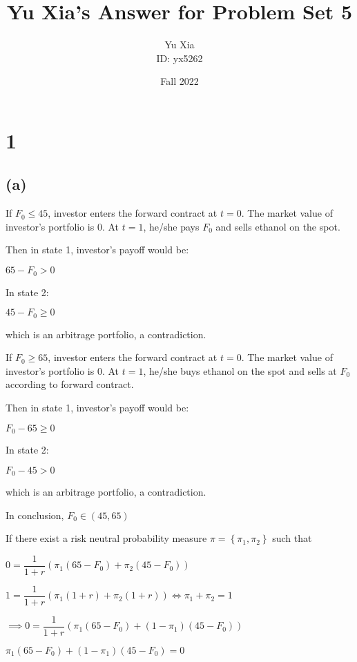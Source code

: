 \documentclass{article}
\author{Yu Xia \\ ID: yx5262}
\title{Yu Xia's Answer for Problem Set 5}
\date{Fall 2022}
\begin{document}
\maketitle

\nocite{*}

\section*{1}

\subsection*{(a)}

If $F_{0}\leqslant45$, investor enters the forward contract at $t=0$. The market value of investor's portfolio is 0. At $t=1$, he/she pays $F_{0}$ and sells ethanol on the spot.

Then in state 1, investor's payoff would be:

$65-F_{0}>0$

In state 2:

$45-F_{0}\geqslant0$

which is an arbitrage portfolio, a contradiction.

If $F_{0}\geqslant65$, investor enters the forward contract at $t=0$. The market value of investor's portfolio is 0. At $t=1$, he/she buys ethanol on the spot and sells at $F_{0}$ according to forward contract.

Then in state 1, investor's payoff would be:

$F_{0}-65\geqslant0$

In state 2:

$F_{0}-45>0$

which is an arbitrage portfolio, a contradiction.

In conclusion, $\boxed{F_{0}\in\left(45,65\right)}$

If there exist a risk neutral probability measure $\pi=\left\{\pi_{1}, \pi_{2}\right\}$ such that

$0=\dfrac{1}{1+r}\left(\pi_{1}\left(65-F_{0}\right)+\pi_{2}\left(45-F_{0}\right)\right)$

$1=\dfrac{1}{1+r}\left(\pi_{1}\left(1+r\right)+\pi_{2}\left(1+r\right)\right)\iff\pi_{1}+\pi_{2}=1$

$\implies0=\dfrac{1}{1+r}\left(\pi_{1}\left(65-F_{0}\right)+\left(1-\pi_{1}\right)\left(45-F_{0}\right)\right)$

$\pi_{1}\left(65-F_{0}\right)+\left(1-\pi_{1}\right)\left(45-F_{0}\right)=0$
\end{document}
